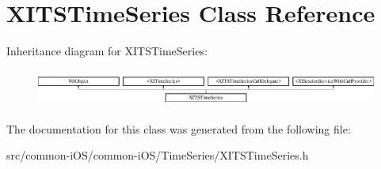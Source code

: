 \hypertarget{interface_x_i_t_s_time_series}{}\section{X\+I\+T\+S\+Time\+Series Class Reference}
\label{interface_x_i_t_s_time_series}
Inheritance diagram for X\+I\+T\+S\+Time\+Series\+:\begin{figure}[H]
\begin{center}
\leavevmode
\includegraphics[height=1.222707cm]{interface_x_i_t_s_time_series}
\end{center}
\end{figure}


The documentation for this class was generated from the following file\+:\begin{DoxyCompactItemize}
\item 
src/common-\/i\+O\+S/common-\/i\+O\+S/\+Time\+Series/X\+I\+T\+S\+Time\+Series.\+h\end{DoxyCompactItemize}
